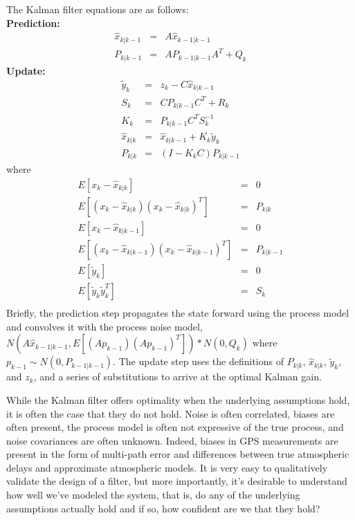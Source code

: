 The Kalman filter equations are as follows:\\
{\bf Prediction:}
\begin{equation}
\begin{aligned}
\hat{x}_{k|k-1} &=& A \hat{x}_{k-1|k-1}\\
P_{k|k-1} &=& A P_{k-1|k-1} A^T + Q_k
\end{aligned}
\end{equation}
{\bf Update:}
\begin{equation}
\begin{aligned}
\tilde{y}_k &=& z_k - C \hat{x}_{k|k-1}\\
S_k &=& C P_{k|k-1} C^T + R_k\\
K_k &=& P_{k|k-1} C^T S_k^{-1}\\
\hat{x}_{k|k} &=& \hat{x}_{k|k-1} + K_k \tilde{y}_k\\
P_{k|k} &=& (I - K_k C) P_{k|k-1}
\end{aligned}
\end{equation}
where
\begin{equation}
\begin{aligned}
E[x_k - \hat{x}_{k|k}] &=& 0\\
E[(x_k - \hat{x}_{k|k})(x_k - \hat{x}_{k|k})^T] &=& P_{k|k}\\
E[x_k - \hat{x}_{k|k-1}] &=& 0\\
E[(x_k - \hat{x}_{k|k-1})(x_k - \hat{x}_{k|k-1})^T] &=& P_{k|k-1}\\
E[\tilde{y}_k] &=& 0\\
E[\tilde{y}_k\tilde{y}_k^T] &=& S_k\\
\end{aligned}
\end{equation}
Briefly, the prediction step propagates the state forward using the process model and convolves it with the process noise model, $N(A\hat{x}_{k-1|k-1}, E[(Ap_{k-1})(Ap_{k-1})^T]) \ast N(0, Q_k)$ where $p_{k-1} \sim N(0,P_{k-1|k-1})$.
 The update step uses the definitions of $P_{k|k}$, $\hat{x}_{k|k}$, $\tilde{y}_k$, and $z_k$, and a series of substitutions to arrive at the optimal Kalman gain.

While the Kalman filter offers optimality when the underlying assumptions hold, it is often the case that they do not hold.  Noise is often correlated, biases are often present, the process model is often not expressive of the true process, and noise covariances are often unknown.  Indeed, biases in GPS measurements are present in the form of multi-path error and differences between true atmospheric delays and approximate atmospheric models.  It is very easy to qualitatively validate the design of a filter, but more importantly, it's desirable to understand how well we've modeled the system, that is, do any of the underlying assumptions actually hold and if so, how confident are we that they hold?

